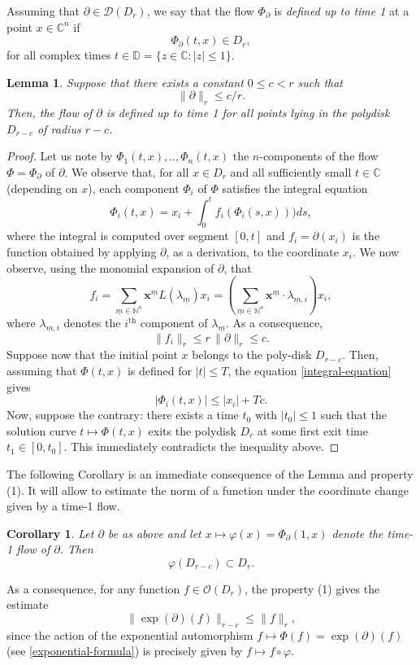 \documentclass[10pt,twoside,reqno]{amsart}
\newtheorem{corollary}[thm]{Corollary}
\newtheorem{lemma}[thm]{Lemma}
\theoremstyle{remark}
\theoremstyle{remark}
\newcommand{\N}{\mathbb{N}}
\newcommand{\C}{\mathbb{C}}
\newcommand{\um}{{\underline m}}
\newcommand{\x}{\mathbf{x}}
\newcommand{\oO}{\mathcal{O}}
\newcommand{\cD}{\mathcal{D}}
\begin{document}
Assuming 
that $\partial \in \cD(D_r)$, we say that the flow $\Phi_\partial$ is {\em defined up to time 1} at a point $x\in \C^n$ if 
$$
\Phi_\partial(t,x) \in D_r,
$$
for all complex times $t \in \mathbb{D} = \{z \in \C : |z| \le 1\}$. 
\begin{lemma}
Suppose that there exists a constant $0 \leq c < r$ such that
\[ \| \partial \|_r \leq c / r.\]
Then, the flow of $\partial$ is defined up to time 1 for all points lying in the polydisk $D_{r-c}$ of radius $r-c$.
\end{lemma}
\begin{proof}
Let us note by $\Phi_1(t,x),..,\Phi_n(t,x)$ the $n$-components of the flow $\Phi = \Phi_\partial$ of $\partial$. We observe that, for all $x \in D_r$ and all sufficiently small $t \in \C$ (depending on $x$), each  component $\Phi_i$ of $\Phi$ satisfies the integral equation
\begin{equation}\label{integral-equation}
\Phi_i(t,x) = x_i + \int_{0}^{t} f_i(\Phi_i(s,x))) ds,
\end{equation}
where the integral is computed over segment $[0,t]$ and $f_i = \partial(x_i)$ is the function obtained by applying $\partial$, as a derivation, to the coordinate $x_i$. 
We now observe, using the monomial expansion of $\partial$, that
\[
 f_i =  \sum_{\um\in \N^n} \x^{\um} L(\lambda_{\um}) x_i = \left(\sum_{\um\in \N^n} \x^{\um}\cdot\lambda_{\um,i} \right) x_i, 
\]
where $\lambda_{\um,i}$ denotes the $i^{\mathrm{th}}$ component of $\lambda_\um$. As a consequence,
\[
\|f_i\|_r \le r\, \|\partial\|_r \le c.
\]
Suppose now that the initial point $x$ belongs to the poly-disk $D_{r-c}$. Then, assuming that $\Phi(t,x)$ is defined for $|t|\le T$, the equation \eqref{integral-equation} gives
$$
|\Phi_i(t,x)| \le |x_i| + T c.
$$
Now, suppose the contrary: there exists a time $t_0$ with $|t_0|\le 1$ such that the solution curve $t \mapsto \Phi(t,x)$ exits the polydisk $D_r$ at some first exit time $t_1 \in [0,t_0]$. This immediately contradicts the inequality above.
\end{proof}
The following Corollary is an immediate consequence of the Lemma and property (1). It will allow to estimate the norm of a function under the coordinate change given by a time-1 flow.
\begin{corollary}\label{corollary-inclusion-of-disks}
Let $\partial$ be as above and let $x \mapsto \varphi(x) = \Phi_\partial(1,x)$ denote the time-1 flow of $\partial$. Then
\[
\varphi(D_{r-c}) \subset D_r.
\]
\end{corollary}
\noindent As a consequence, for any function $f\in \oO(D_r)$, the property (1) gives the estimate
\begin{equation}\label{estimate-f-flow}
\| \exp(\partial)(f) \|_{r-c} \le \| f \|_r, 
\end{equation}
since the action of the exponential automorphism $f \mapsto \Phi(f) = \exp(\partial)(f)$ (see \eqref{exponential-formula}) is precisely given by $f \mapsto f \circ \varphi$.
\end{document}
